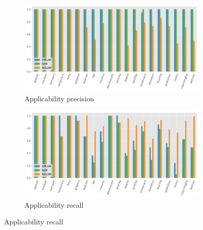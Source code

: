 \begin{figure}[ht]
  \begin{subfigure}[b]{0.45\textwidth}
    \includegraphics[width=\textwidth]{figures/2_traces/app_precision.png}
    \caption{Applicability precision}
  \end{subfigure}
  \hfill
  \begin{subfigure}[b]{0.45\textwidth}
    \includegraphics[width=\textwidth]{figures/2_traces/app_recall.png}
    \caption{Applicability recall}
  \end{subfigure}

  \vspace{1em}


\end{figure}
